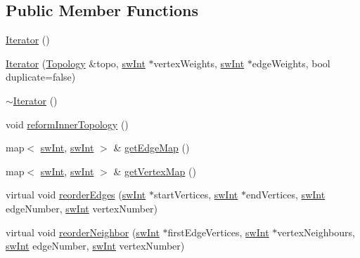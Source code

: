 \subsection*{Public Member Functions}
\begin{DoxyCompactItemize}
\item 
\mbox{\hyperlink{classUNAT_1_1Iterator_a3a341a86404dce424bc82e4a991ef29b}{Iterator}} ()
\item 
\mbox{\hyperlink{classUNAT_1_1Iterator_acc1365ff1a2078c14424624b75fe2c7e}{Iterator}} (\mbox{\hyperlink{classUNAT_1_1Topology}{Topology}} \&topo, \mbox{\hyperlink{include_2swMacro_8h_a113cf5f6b5377cdf3fac6aa4e443e9aa}{sw\+Int}} $\ast$vertex\+Weights, \mbox{\hyperlink{include_2swMacro_8h_a113cf5f6b5377cdf3fac6aa4e443e9aa}{sw\+Int}} $\ast$edge\+Weights, bool duplicate=false)
\item 
\mbox{\hyperlink{classUNAT_1_1Iterator_a5fe65bc2a92032f20c20adf525e0aa26}{$\sim$\+Iterator}} ()
\item 
void \mbox{\hyperlink{classUNAT_1_1Iterator_ad25934bd952c01d0a82d3db33e46604a}{reform\+Inner\+Topology}} ()
\item 
map$<$ \mbox{\hyperlink{include_2swMacro_8h_a113cf5f6b5377cdf3fac6aa4e443e9aa}{sw\+Int}}, \mbox{\hyperlink{include_2swMacro_8h_a113cf5f6b5377cdf3fac6aa4e443e9aa}{sw\+Int}} $>$ \& \mbox{\hyperlink{classUNAT_1_1Iterator_ac5ce1cbee8e78efc52ba25d3da9eb9c8}{get\+Edge\+Map}} ()
\item 
map$<$ \mbox{\hyperlink{include_2swMacro_8h_a113cf5f6b5377cdf3fac6aa4e443e9aa}{sw\+Int}}, \mbox{\hyperlink{include_2swMacro_8h_a113cf5f6b5377cdf3fac6aa4e443e9aa}{sw\+Int}} $>$ \& \mbox{\hyperlink{classUNAT_1_1Iterator_ac05240478478b3d1aba6af28e364cf50}{get\+Vertex\+Map}} ()
\item 
virtual void \mbox{\hyperlink{classUNAT_1_1Iterator_a12e23a0188bf8c4a7d3de798ee9aa85f}{reorder\+Edges}} (\mbox{\hyperlink{include_2swMacro_8h_a113cf5f6b5377cdf3fac6aa4e443e9aa}{sw\+Int}} $\ast$start\+Vertices, \mbox{\hyperlink{include_2swMacro_8h_a113cf5f6b5377cdf3fac6aa4e443e9aa}{sw\+Int}} $\ast$end\+Vertices, \mbox{\hyperlink{include_2swMacro_8h_a113cf5f6b5377cdf3fac6aa4e443e9aa}{sw\+Int}} edge\+Number, \mbox{\hyperlink{include_2swMacro_8h_a113cf5f6b5377cdf3fac6aa4e443e9aa}{sw\+Int}} vertex\+Number)
\item 
virtual void \mbox{\hyperlink{classUNAT_1_1Iterator_ac54a79d677f7452d03a02fea6fb435f3}{reorder\+Neighbor}} (\mbox{\hyperlink{include_2swMacro_8h_a113cf5f6b5377cdf3fac6aa4e443e9aa}{sw\+Int}} $\ast$first\+Edge\+Vertices, \mbox{\hyperlink{include_2swMacro_8h_a113cf5f6b5377cdf3fac6aa4e443e9aa}{sw\+Int}} $\ast$vertex\+Neighbours, \mbox{\hyperlink{include_2swMacro_8h_a113cf5f6b5377cdf3fac6aa4e443e9aa}{sw\+Int}} edge\+Number, \mbox{\hyperlink{include_2swMacro_8h_a113cf5f6b5377cdf3fac6aa4e443e9aa}{sw\+Int}} vertex\+Number)

\end{DoxyCompactItemize}
